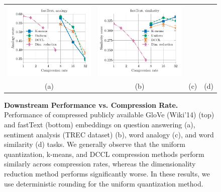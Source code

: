 \begin{figure}
\begin{tabular}{@{\hskip -0.0in}c@{\hskip -0.0in}c@{\hskip -0.0in}c@{\hskip -0.0in}c@{\hskip -0.0in}}
		\includegraphics[width=.245\linewidth]{figures/fasttext1m_intrinsics_google-mul_vs_compression_linx_det.pdf} &
		\includegraphics[width=.245\linewidth]{figures/fasttext1m_intrinsics_bruni_men_vs_compression_linx_det.pdf} \\
		\;\;\;\;\;(a) & \;\;\;\;\;\;(b) & \;\;\;\;\;\;(c) & \;\;\;\;\;\;(d)
	\end{tabular}
	\caption{
		\textbf{Downstream Performance vs. Compression Rate.}
		Performance of compressed publicly available GloVe (Wiki'14) (top) and fastText (bottom) embeddings on question answering (a), sentiment analysis (TREC dataset) (b), word analogy (c), and word similarity (d) tasks.
		We generally observe that the uniform quantization, k-means, and DCCL compression methods perform similarly across compression rates, whereas the dimensionality reduction method performs significantly worse. In these results, we use deterministic rounding for the uniform quantization method.
	}
	\label{fig:perf_comp}
\end{figure}

